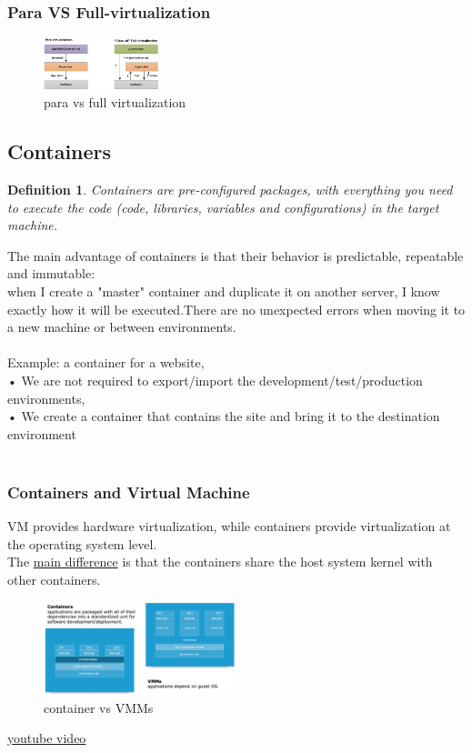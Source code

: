 \documentclass[10pt, oneside]{article}
\newtheorem{defn}{Definition}
\begin{document}
\subsubsection*{Para VS Full-virtualization}
\begin{figure}[H]
    \begin{center}
    \includegraphics[width=0.3\textwidth]{img/img42.png}
    \caption{para vs full virtualization}
    \label{fig:para vs full}
    \end{center}
\end{figure}

\subsection{Containers}
\begin{defn}
    Containers are pre-configured packages, with everything you need to execute the code (code, libraries, variables and configurations) in the target machine.
\end{defn}
The main advantage of containers is that their behavior is predictable, repeatable and immutable:\\
when I create a "master" container and duplicate it on another server, I know exactly how it will be executed.There are no unexpected errors when moving it to a new machine or between environments.\\\\
Example: a container for a website,\\
• We are not required to export/import the development/test/production environments,\\
• We create a container that contains the site and bring it to the destination environment\\\\
\subsubsection{Containers and Virtual Machine}
VM provides hardware virtualization, while containers provide virtualization at the operating system level.\\
The \underline{main difference} is that the containers share the host system kernel with other containers.
\begin{figure}[H]
    \begin{center}
    \includegraphics[width=0.5\textwidth]{img/img43.png}
    \caption{container vs VMMs}
    \label{fig:container vs VMMs}
    \end{center}
\end{figure}
\href{https://www.youtube.com/watch?v=cjXI-yxqGTI}{youtube video}
\end{document}
